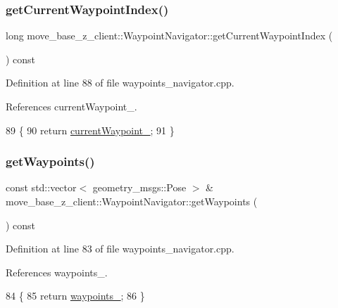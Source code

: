 \subsubsection{\texorpdfstring{get\+Current\+Waypoint\+Index()}{getCurrentWaypointIndex()}}
{\footnotesize\ttfamily long move\+\_\+base\+\_\+z\+\_\+client\+::\+Waypoint\+Navigator\+::get\+Current\+Waypoint\+Index (\begin{DoxyParamCaption}{ }\end{DoxyParamCaption}) const}



Definition at line 88 of file waypoints\+\_\+navigator.\+cpp.



References current\+Waypoint\+\_\+.


\begin{DoxyCode}
89 \{
90   \textcolor{keywordflow}{return} \hyperlink{classmove__base__z__client_1_1WaypointNavigator_a7da763128724f7b08c32c79cb3a88934}{currentWaypoint\_};
91 \}
\end{DoxyCode}
\mbox{\label{classmove__base__z__client_1_1WaypointNavigator_a9dd82fa537622f6b1fd34985933e87bd}} 
\subsubsection{\texorpdfstring{get\+Waypoints()}{getWaypoints()}}
{\footnotesize\ttfamily const std\+::vector$<$ geometry\+\_\+msgs\+::\+Pose $>$ \& move\+\_\+base\+\_\+z\+\_\+client\+::\+Waypoint\+Navigator\+::get\+Waypoints (\begin{DoxyParamCaption}{ }\end{DoxyParamCaption}) const}



Definition at line 83 of file waypoints\+\_\+navigator.\+cpp.



References waypoints\+\_\+.


\begin{DoxyCode}
84 \{
85   \textcolor{keywordflow}{return} \hyperlink{classmove__base__z__client_1_1WaypointNavigator_a83e4e39987eaf1c8856d32d581eb4cd0}{waypoints\_};
86 \}
\end{DoxyCode}
\mbox{\label{classmove__base__z__client_1_1WaypointNavigator_acf4e3fc40dca2aaf15b518e03639109f}} 
